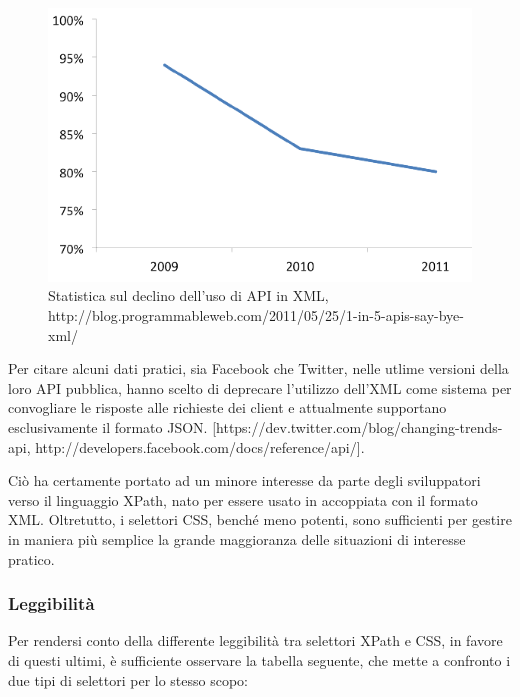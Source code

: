 \documentclass[12pt]{toptesi}
\begin{document}
\begin{figure}[htbp]
\begin{center}
\includegraphics[width=\textwidth]{images/byexml.png}
\caption{Statistica sul declino dell'uso di API in XML, http://blog.programmableweb.com/2011/05/25/1-in-5-apis-say-bye-xml/}
\label{default}
\end{center}
\end{figure}

Per citare alcuni dati pratici, sia Facebook che Twitter, nelle utlime versioni della loro API pubblica, hanno scelto di deprecare l'utilizzo dell'XML come sistema per convogliare le risposte alle richieste dei client e attualmente supportano esclusivamente il formato JSON. [https://dev.twitter.com/blog/changing-trends-api, http://developers.facebook.com/docs/reference/api/].

Ciò ha certamente portato ad un minore interesse da parte degli sviluppatori verso il linguaggio XPath, nato per essere usato in accoppiata con il formato XML. Oltretutto, i selettori CSS, benché meno potenti, sono sufficienti per gestire in maniera più semplice la grande maggioranza delle situazioni di interesse pratico.  

\subsubsection{Leggibilità}

Per rendersi conto della differente leggibilità tra selettori XPath e CSS, in favore di questi ultimi, è sufficiente osservare la tabella seguente, che mette a confronto i due tipi di selettori per lo stesso scopo: 
\end{document}
